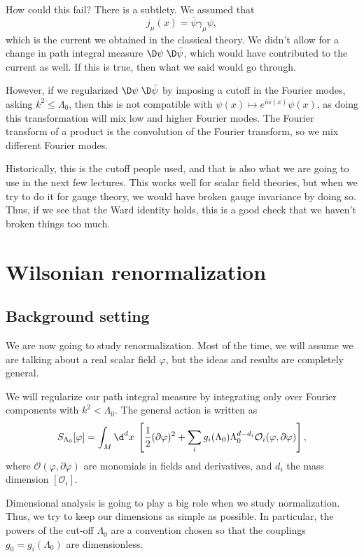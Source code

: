 \documentclass[a4paper]{article}
\begin{document}
How could this fail? There is a subtlety. We assumed that
\[
  j_\mu(x) = \bar\psi \gamma_\mu \psi,
\]
which is the current we obtained in the classical theory. We didn't allow for a change in path integral measure $\D \psi\;\D \bar\psi$, which would have contributed to the current as well. If this is true, then what we said would go through.

However, if we regularized $\D \psi\; \D \bar\psi$ by imposing a cutoff in the Fourier modes, asking $k^2 \leq \Lambda_0$, then this is not compatible with $\psi(x) \mapsto e^{i\alpha(x)} \psi(x)$, as doing this transformation will mix low and higher Fourier modes. The Fourier transform of a product is the convolution of the Fourier transform, so we mix different Fourier modes.

Historically, this is the cutoff people used, and that is also what we are going to use in the next few lectures. This works well for scalar field theories, but when we try to do it for gauge theory, we would have broken gauge invariance by doing so. Thus, if we see that the Ward identity holds, this is a good check that we haven't broken things too much.

\section{Wilsonian renormalization}
\subsection{Background setting}
We are now going to study renormalization. Most of the time, we will assume we are talking about a real scalar field $\varphi$, but the ideas and results are completely general.

We will regularize our path integral measure by integrating only over Fourier components with $k^2 < \Lambda_0$. The general action is written as
\[
  S_{\Lambda_0} [\varphi] = \int_M \d^d x\; \left[\frac{1}{2}(\partial \varphi)^2 + \sum_i g_i(\Lambda_0) \Lambda^{d - d_i}_0 \mathcal{O}_i(\varphi , \partial\varphi)\right],
\]
where $\mathcal{O}(\varphi, \partial \varphi)$ are monomials in fields and derivatives, and $d_i$ the mass dimension $[\mathcal{O}_i]$.

Dimensional analysis is going to play a big role when we study normalization. Thus, we try to keep our dimensions as simple as possible. In particular, the powers of the cut-off $\Lambda_0$ are a convention chosen so that the couplings $g_0 = g_i(\Lambda_0)$ are dimensionless.
\end{document}

